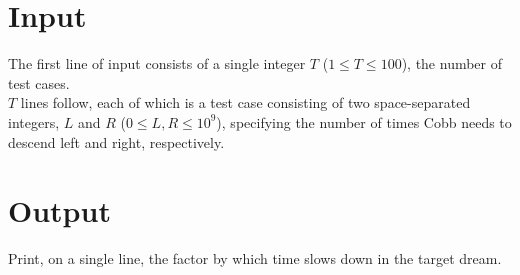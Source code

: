 \section*{Input}
The first line of input consists of a single integer $T$ ($1 \leq T \leq 100$), the number of test cases.\\
$T$ lines follow, each of which is a test case consisting of two space-separated integers, $L$ and $R$ ($0 \leq L, R \leq 10^{9}$), specifying the number of times Cobb needs to descend left and right, respectively.

\section*{Output}
Print, on a single line, the factor by which time slows down in the target dream.\\
